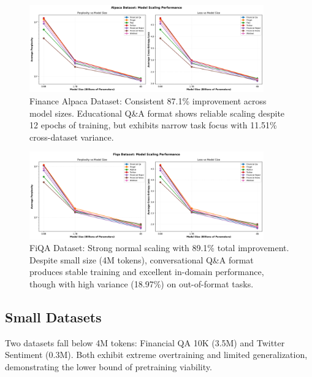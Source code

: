 \begin{figure}[h]
\centering
\includegraphics[width=0.9\textwidth]{figures/scaling_alpaca.png}
\caption[Finance Alpaca Dataset: Scaling Behavior]{Finance Alpaca Dataset: Consistent 87.1\% improvement across model sizes. Educational Q\&A format shows reliable scaling despite 12 epochs of training, but exhibits narrow task focus with 11.51\% cross-dataset variance.}
\label{fig:scaling_alpaca}
\end{figure}

\begin{figure}[h]
\centering
\includegraphics[width=0.9\textwidth]{figures/scaling_fiqa.png}
\caption[FiQA Dataset: Scaling Behavior]{FiQA Dataset: Strong normal scaling with 89.1\% total improvement. Despite small size (4M tokens), conversational Q\&A format produces stable training and excellent in-domain performance, though with high variance (18.97\%) on out-of-format tasks.}
\label{fig:scaling_fiqa}
\end{figure}







\subsection{Small Datasets}

Two datasets fall below 4M tokens: Financial QA 10K (3.5M) and Twitter Sentiment (0.3M). Both exhibit extreme overtraining and limited generalization, demonstrating the lower bound of pretraining viability.

